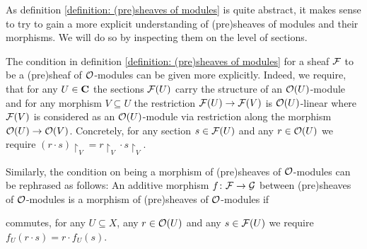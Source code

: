 As definition \ref{definition: (pre)sheaves of modules} is quite abstract, it makes sense to try to gain a more explicit understanding of (pre)sheaves of modules and their morphisms. We will do so by inspecting them on the level of sections.
\begin{remark}
	The condition in definition \ref{definition: (pre)sheaves of modules} for a sheaf ${\mathcal{F}}$ to be a (pre)sheaf of ${\mathcal{O}}$-modules can be given more explicitly. Indeed, we require, that for any $U \in {{\mathbf{C}}}$ the sections ${\mathcal{F}}(U)$ carry the structure of an ${\mathcal{O}}(U)$-module and for any morphism $V\subseteq U$ the restriction ${\mathcal{F}}(U)\to {\mathcal{F}}(V)$ is ${\mathcal{O}}(U)$-linear where ${\mathcal{F}}(V)$ is considered as an ${\mathcal{O}}(U)$-module via restriction along the morphism ${\mathcal{O}}(U)\to{\mathcal{O}}(V)$. Concretely, for any section $s\in {\mathcal{F}}(U)$ and any $r\in {\mathcal{O}}(U)$ we require $(r\cdot s)\restriction_V = r\restriction_V \cdot s\restriction_V$.
	
	Similarly, the condition on being a morphism of (pre)sheaves of ${\mathcal{O}}$-modules can be rephrased as follows: An additive morphism $f\colon {\mathcal{F}}\to {\mathcal{G}}$ between (pre)sheaves of ${\mathcal{O}}$-modules is a morphism of (pre)sheaves of ${\mathcal{O}}$-modules if
	\begin{center}
	\end{center}
	commutes, \ie for any $U\subseteq X$, any $r\in {\mathcal{O}}(U)$ and any $s\in {\mathcal{F}}(U)$ we require $f_U(r\cdot s) = r\cdot f_U(s)$.
\end{remark}

